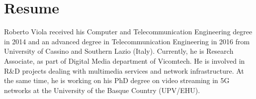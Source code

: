 \chapter{Resume}

Roberto Viola received his Computer and Telecommunication Engineering degree in 2014 and an advanced degree in Telecommunication Engineering in 2016 from University of Cassino and Southern Lazio (Italy). Currently, he is Research Associate, as part of Digital Media department of Vicomtech. He is involved in R\&D projects dealing with multimedia services and network infrastructure. At the same time, he is working on his PhD degree on video streaming in 5G networks at the University of the Basque Country (UPV/EHU).
